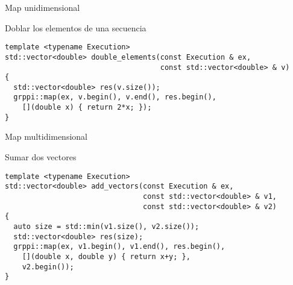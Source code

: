 \begin{frame}[t,fragile]{Map unidimensional}
\begin{block}{Doblar los elementos de una secuencia}
\begin{lstlisting}
template <typename Execution>
std::vector<double> double_elements(const Execution & ex, 
                                    const std::vector<double> & v) 
{
  std::vector<double> res(v.size());
  grppi::map(ex, v.begin(), v.end(), res.begin(), 
    [](double x) { return 2*x; });
}
\end{lstlisting}
\end{block}
\end{frame}

\begin{frame}[t,fragile]{Map multidimensional}
\begin{block}{Sumar dos vectores}
\begin{lstlisting}
template <typename Execution>
std::vector<double> add_vectors(const Execution & ex, 
                                const std::vector<double> & v1,
                                const std::vector<double> & v2) 
{
  auto size = std::min(v1.size(), v2.size());
  std::vector<double> res(size);
  grppi::map(ex, v1.begin(), v1.end(), res.begin(),
    [](double x, double y) { return x+y; },
    v2.begin());
}
\end{lstlisting}
\end{block}
\end{frame}
